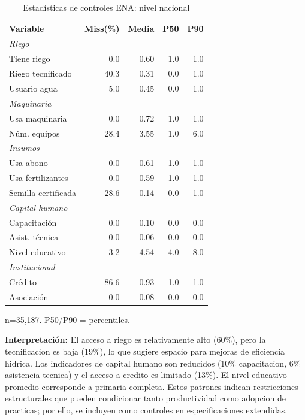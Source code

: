 \documentclass[10pt,a4paper]{article}
\begin{document}
\begin{table}[H]
\centering
\caption{Estadísticas de controles ENA: nivel nacional}
\label{tab:ena_controls_overall}
\begin{threeparttable}
\small
\begin{tabular}{lrrrr}
\toprule
\textbf{Variable} & \textbf{Miss(\%)} & \textbf{Media} & \textbf{P50} & \textbf{P90} \\
\midrule
\multicolumn{5}{l}{\textit{Riego}} \\
Tiene riego & 0.0 & 0.60 & 1.0 & 1.0 \\
Riego tecnificado & 40.3 & 0.31 & 0.0 & 1.0 \\
Usuario agua & 5.0 & 0.45 & 0.0 & 1.0 \\
\midrule
\multicolumn{5}{l}{\textit{Maquinaria}} \\
Usa maquinaria & 0.0 & 0.72 & 1.0 & 1.0 \\
Núm. equipos & 28.4 & 3.55 & 1.0 & 6.0 \\
\midrule
\multicolumn{5}{l}{\textit{Insumos}} \\
Usa abono & 0.0 & 0.61 & 1.0 & 1.0 \\
Usa fertilizantes & 0.0 & 0.59 & 1.0 & 1.0 \\
Semilla certificada & 28.6 & 0.14 & 0.0 & 1.0 \\
\midrule
\multicolumn{5}{l}{\textit{Capital humano}} \\
Capacitación & 0.0 & 0.10 & 0.0 & 0.0 \\
Asist. técnica & 0.0 & 0.06 & 0.0 & 0.0 \\
Nivel educativo & 3.2 & 4.54 & 4.0 & 8.0 \\
\midrule
\multicolumn{5}{l}{\textit{Institucional}} \\
Crédito & 86.6 & 0.93 & 1.0 & 1.0 \\
Asociación & 0.0 & 0.08 & 0.0 & 0.0 \\
\bottomrule
\end{tabular}
\begin{tablenotes}
\footnotesize
\item n=35,187. P50/P90 = percentiles.
\end{tablenotes}
\end{threeparttable}
\end{table}

\textbf{Interpretación:} El acceso a riego es relativamente alto (60\%), pero la tecnificacion es baja (19\%), lo que sugiere espacio para mejoras de eficiencia hidrica. Los indicadores de capital humano son reducidos (10\% capacitacion, 6\% asistencia tecnica) y el acceso a credito es limitado (13\%). El nivel educativo promedio corresponde a primaria completa. Estos patrones indican restricciones estructurales que pueden condicionar tanto productividad como adopcion de practicas; por ello, se incluyen como controles en especificaciones extendidas.
\end{document}
